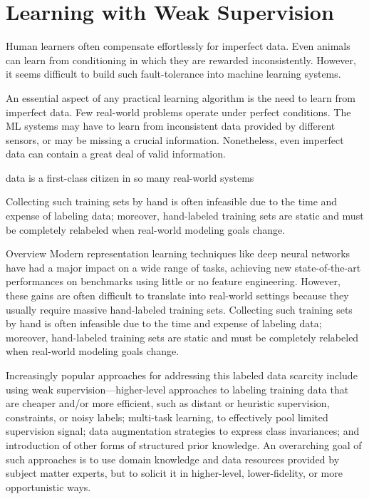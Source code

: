 \part{Learning with Weak Supervision}
\label{part2}
%

Human learners often compensate effortlessly for imperfect data. Even animals can learn from conditioning in which they are rewarded inconsistently. However, it seems difficult to build such fault-tolerance into machine learning systems.

An essential aspect of any practical learning algorithm is the need to learn from imperfect data. Few real-world problems operate under perfect conditions. The ML systems may have to learn from inconsistent data provided by different sensors, or may be missing a crucial information.
Nonetheless, even imperfect data can contain a great deal of valid information.


data is a first-class citizen in so many real-world systems


Collecting such training sets by hand is often infeasible due to the time and expense of labeling data; moreover, hand-labeled training sets are static and must be completely relabeled when real-world modeling goals change.

Overview
Modern representation learning techniques like deep neural networks have had a major impact on a wide range of tasks, achieving new state-of-the-art performances on benchmarks using little or no feature engineering. However, these gains are often difficult to translate into real-world settings because they usually require massive hand-labeled training sets. Collecting such training sets by hand is often infeasible due to the time and expense of labeling data; moreover, hand-labeled training sets are static and must be completely relabeled when real-world modeling goals change.

Increasingly popular approaches for addressing this labeled data scarcity include using weak supervision---higher-level approaches to labeling training data that are cheaper and/or more efficient, such as distant or heuristic supervision, constraints, or noisy labels; multi-task learning, to effectively pool limited supervision signal; data augmentation strategies to express class invariances; and introduction of other forms of structured prior knowledge. An overarching goal of such approaches is to use domain knowledge and data resources provided by subject matter experts, but to solicit it in higher-level, lower-fidelity, or more opportunistic ways.


